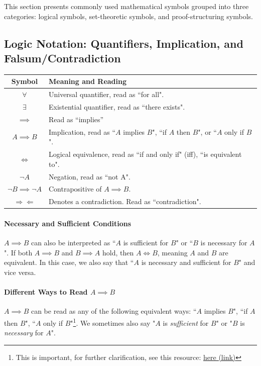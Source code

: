 This section presents commonly used mathematical symbols grouped into three categories: logical symbols, set-theoretic symbols, and proof-structuring symbols.

\subsection{Logic Notation: Quantifiers, Implication, and Falsum/Contradiction}

\begin{center}
\begin{tabular}{|c|l|}
    \hline
    \textbf{Symbol} & \textbf{Meaning and Reading} \\
    \hline
    $\forall$ & Universal quantifier, read as ``for all". \index{$\forall$}\\
    $\exists$ & Existential quantifier, read as ``there exists". \index{$\exists$} \\
    $\implies$ & Read as ``implies'' \index{$\implies$}\\
    $A \implies B$ & Implication, read as ``$A$ implies $B$", ``if $A$ then $B$", or ``$A$ only if $B$". \\
    $\iff$ & Logical equivalence, read as ``if and only if" (iff), ``is equivalent to". \index{$\iff$}\\
    $\lnot A$ & Negation, read as ``not A". \index{$\lnot$}\\
    $\lnot B \implies \lnot A$ & Contrapositive of $A \implies B$. \\
    $\Rightarrow\Leftarrow$ & Denotes a contradiction. Read as ``contradiction". \index{$\Rightarrow \Leftarrow$} \\
    \hline
\end{tabular}
\end{center}

\paragraph{Necessary and Sufficient Conditions}
$A \implies B$ can also be interpreted as ``$A$ is sufficient for $B$" or ``$B$ is necessary for $A$". If both $A \implies B$ and $B \implies A$ hold, then $A \iff B$, meaning $A$ and $B$ are equivalent. In this case, we also say that ``$A$ is necessary and sufficient for $B$" and vice versa.

\paragraph{Different Ways to Read $A \implies B$}
$A \implies B$ can be read as any of the following equivalent ways: ``$A$ implies $B$", ``if $A$ then $B$", ``$A$ only if $B$"\footnote{This is important, for further clarification, see this resource: \href{https://criticalthinkeracademy.com/courses/propositional-logic/lectures/51574}{here (link)}}. We sometimes also say "$A$ is \textit{sufficient} for $B$" or "$B$ is \textit{necessary} for $A$". \\

